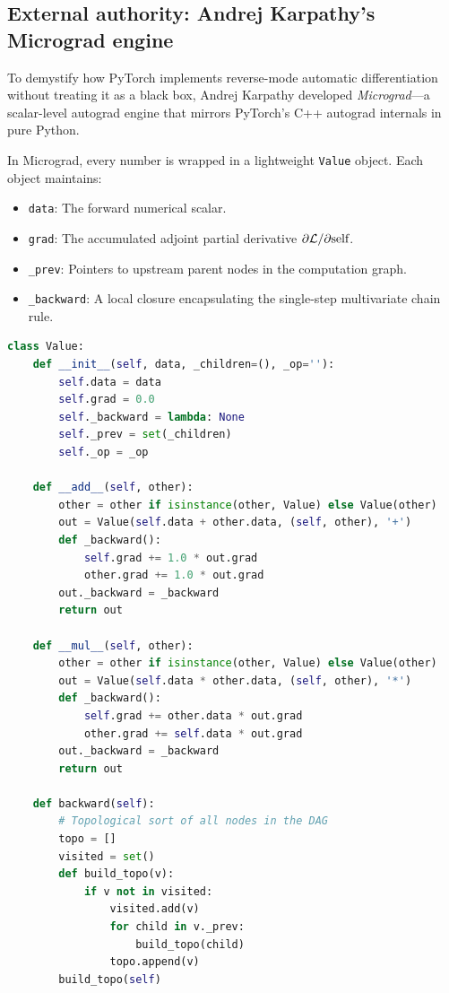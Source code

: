 \documentclass[../labs.tex]{subfiles}
\begin{document}
\subsection{External authority: Andrej Karpathy's Micrograd engine}
To demystify how PyTorch implements reverse-mode automatic differentiation without treating it as a black box, Andrej Karpathy developed \emph{Micrograd}---a scalar-level autograd engine that mirrors PyTorch's C++ autograd internals in pure Python.

\begin{deepdive}
In Micrograd, every number is wrapped in a lightweight \texttt{Value} object. Each object maintains:
\begin{itemize}
    \item \texttt{data}: The forward numerical scalar.
    \item \texttt{grad}: The accumulated adjoint partial derivative $\partial \mathcal{L} / \partial \text{self}$.
    \item \texttt{\_prev}: Pointers to upstream parent nodes in the computation graph.
    \item \texttt{\_backward}: A local closure encapsulating the single-step multivariate chain rule.
\end{itemize}

\begin{lstlisting}[language=Python, caption={Core structure of Andrej Karpathy's scalar autograd engine.}, label={lst:karpathy_micrograd}]
class Value:
    def __init__(self, data, _children=(), _op=''):
        self.data = data
        self.grad = 0.0
        self._backward = lambda: None
        self._prev = set(_children)
        self._op = _op

    def __add__(self, other):
        other = other if isinstance(other, Value) else Value(other)
        out = Value(self.data + other.data, (self, other), '+')
        def _backward():
            self.grad += 1.0 * out.grad
            other.grad += 1.0 * out.grad
        out._backward = _backward
        return out

    def __mul__(self, other):
        other = other if isinstance(other, Value) else Value(other)
        out = Value(self.data * other.data, (self, other), '*')
        def _backward():
            self.grad += other.data * out.grad
            other.grad += self.data * out.grad
        out._backward = _backward
        return out

    def backward(self):
        # Topological sort of all nodes in the DAG
        topo = []
        visited = set()
        def build_topo(v):
            if v not in visited:
                visited.add(v)
                for child in v._prev:
                    build_topo(child)
                topo.append(v)
        build_topo(self)


\end{lstlisting}
\end{deepdive}
\end{document}
